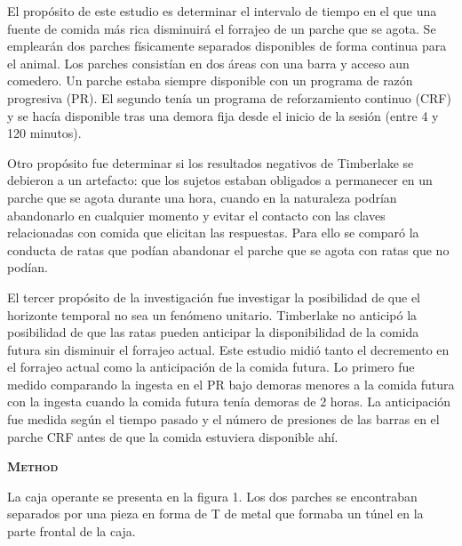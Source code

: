 \documentclass[a4paper,12pt]{article}
\begin{document}
El propósito de este estudio es determinar el intervalo de tiempo en el que una fuente de comida más rica disminuirá el forrajeo de un parche que se agota. Se emplearán dos parches físicamente separados disponibles de forma continua para el animal. Los parches consistían en dos áreas con una barra y acceso aun comedero. Un parche estaba siempre disponible con un programa de razón progresiva (PR). El segundo tenía un programa de reforzamiento continuo (CRF) y se hacía disponible tras una demora fija desde el inicio de la sesión (entre 4 y 120 minutos).

Otro propósito fue determinar si los resultados negativos de Timberlake se debieron a un artefacto: que los sujetos estaban obligados a permanecer en un parche que se agota durante una hora, cuando en la naturaleza podrían abandonarlo en cualquier momento y evitar el contacto con las claves relacionadas con comida que elicitan las respuestas. Para ello se comparó la conducta de ratas que podían abandonar el parche que se agota con ratas que no podían.

El tercer propósito de la investigación fue investigar la posibilidad de que el horizonte temporal no sea un fenómeno unitario. Timberlake no anticipó la posibilidad de que las ratas pueden anticipar la disponibilidad de la comida futura sin disminuir el forrajeo actual. Este estudio midió tanto el decremento en el forrajeo actual como la anticipación de la comida futura. Lo primero fue medido comparando la ingesta en el PR bajo demoras menores a la comida futura con la ingesta cuando la comida futura tenía demoras de 2 horas. La anticipación fue medida según el tiempo pasado y el número de presiones de las barras en el parche CRF antes de que la comida estuviera disponible ahí.

{\scshape\bfseries Method}

La caja operante se presenta en la figura 1. Los dos parches se encontraban separados por una pieza en forma de T de metal que formaba un túnel en la parte frontal de la caja.
\end{document}

